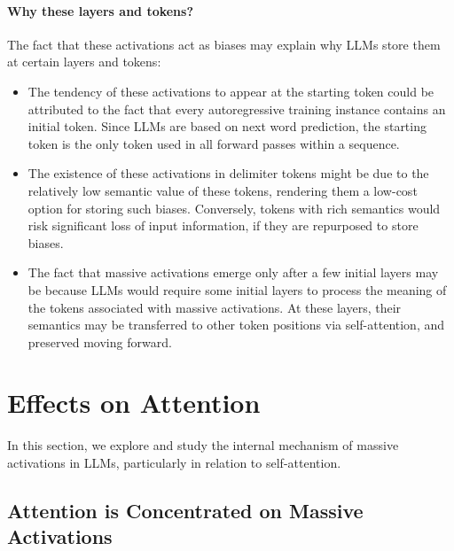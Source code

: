 \documentclass[10pt]{article}
\theoremstyle{definition}
\theoremstyle{plain}
\begin{document}
\paragraph{Why these layers and tokens?} The fact that these activations act as biases may explain why LLMs store them at certain layers and tokens:
\begin{itemize}[topsep=-1.5pt,itemsep=-.5ex]
    \item The tendency of these activations to appear at the starting token could be attributed to the fact that every autoregressive training instance contains an initial token. Since LLMs are based on next word prediction, the starting token is the only token used in all forward passes within a sequence.
    \item The existence of these activations in delimiter tokens might be due to the relatively low semantic value of these tokens, rendering them a low-cost option for storing such biases. Conversely, tokens with rich semantics would risk significant loss of input information, if they are repurposed to store biases.
    \item The fact that massive activations emerge only after a few initial layers may be because LLMs would require some initial layers to process the meaning of the tokens associated with massive activations. At these layers, their semantics may be transferred to other token positions via self-attention, and preserved moving forward.
\end{itemize}











\section{Effects on Attention}\label{label-attn-bias}
In this section, we explore and study the internal mechanism of massive activations in LLMs, particularly in relation to self-attention. 





\subsection{Attention is Concentrated on Massive Activations}\label{sec-attn-concentrate}
\end{document}
